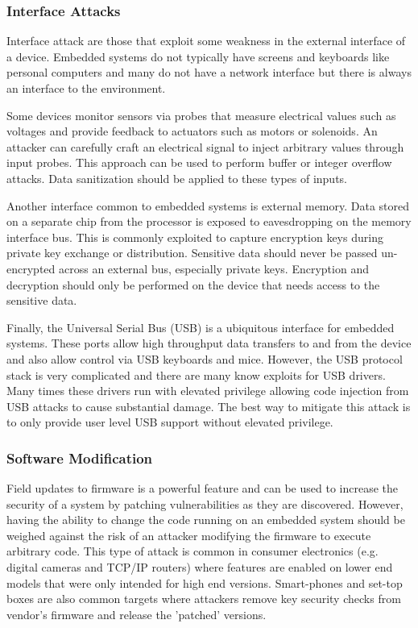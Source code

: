 \documentclass[final,conference,11pt]{IEEEtran}
\begin{document}
\subsubsection{Interface Attacks}
Interface attack are those that exploit some weakness in the external interface of a device.  Embedded systems do not typically have screens and keyboards like personal computers and many do not have a network interface but there is always an interface to the environment.  

Some devices monitor sensors via probes that measure electrical values such as voltages and provide feedback to actuators such as motors or solenoids. An attacker can carefully craft an electrical signal to inject arbitrary values through input probes.  This approach can be used to perform buffer or integer overflow attacks.  Data sanitization should be applied to these types of inputs.\cite{Jyostna2011} 

Another interface common to embedded systems is external memory.  Data stored on a separate chip from the processor is exposed to eavesdropping on the memory interface bus.  This is commonly exploited to capture encryption keys during private key exchange or distribution.  Sensitive data should never be passed un-encrypted across an external bus, especially private keys.  Encryption and decryption should only be performed on the device that needs access to the sensitive data.\cite{off chip memory}

Finally, the Universal Serial Bus (USB) is a ubiquitous interface for embedded systems.  These ports allow high throughput data transfers to and from the device and also allow control via USB keyboards and mice.  However, the USB protocol stack is very complicated and there are many know exploits for USB drivers.  Many times these drivers run with elevated privilege allowing code injection from USB attacks to cause substantial damage.  The best way to mitigate this attack is to only provide user level USB support without elevated privilege. \cite{USB}

\subsubsection{Software Modification}
Field updates to firmware is a powerful feature and can be used to increase the security of a system by patching vulnerabilities as they are discovered.  However, having the ability to change the code running on an embedded system should be weighed against the risk of an attacker modifying the firmware to execute arbitrary code. This type of attack is common in consumer electronics (e.g. digital cameras and TCP/IP routers)  where features are enabled on lower end models that were only intended for high end versions.  Smart-phones and set-top boxes are also common targets where attackers remove key security checks from vendor's firmware and release the 'patched' versions.
\end{document}
